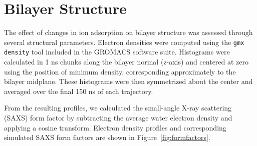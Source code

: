 \documentclass[12pt,openany,final]{book}
\begin{document}
\section{Bilayer Structure}
The effect of changes in ion adsorption on bilayer structure was assessed through several structural parameters. Electron densities were
computed using the \texttt{gmx density} tool included in the GROMACS software suite. Histograms were calculated in 1 ns chunks along the
bilayer normal (z-axis) and centered at zero using the position of minimum density, corresponding approximately to the bilayer midplane.
These histograms were then symmetrized about the center and averaged over the final 150 ns of each trajectory.

From the resulting profiles, we calculated the small-angle X-ray scattering (SAXS) form factor by subtracting the average water electron
density and applying a cosine transform. Electron density profiles and corresponding simulated SAXS form factors are shown in
Figure~\ref{fig:formfactors}.
\end{document}
